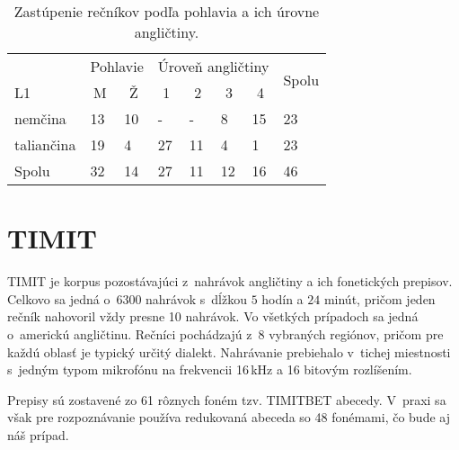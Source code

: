\begin{table}[]
\centering
\begin{tabular}{llllllll}
\hline
\multicolumn{1}{c}{} & \multicolumn{2}{c}{Pohlavie}                  & \multicolumn{4}{c}{Úroveň angličtiny}                                                         & \multicolumn{1}{c}{\multirow{2}{*}{Spolu}} \\
L1                   & \multicolumn{1}{c}{M} & \multicolumn{1}{c}{Ž} & \multicolumn{1}{c}{1} & \multicolumn{1}{c}{2} & \multicolumn{1}{c}{3} & \multicolumn{1}{c}{4} & \multicolumn{1}{c}{}                       \\ \hline
nemčina              & 13                    & 10                    & -                     & -                     & 8                     & 15                    & 23                                         \\
taliančina           & 19                    & 4                     & 27                    & 11                    & 4                     & 1                     & 23                                         \\
Spolu                & 32                    & 14                    & 27                    & 11                    & 12                    & 16                    & 46                                         \\ \hline
\end{tabular}
\caption{Zastúpenie rečníkov podľa pohlavia a ich úrovne angličtiny.} \label{tab:speaker-sample}
\end{table}



\section{TIMIT} \label{sec:timit}

TIMIT \cite{TIMIT1992}  je korpus pozostávajúci z~nahrávok angličtiny a ich fonetických prepisov. Celkovo sa jedná o~6300 nahrávok s~dĺžkou $5$ hodín a $24$ minút, pričom jeden rečník nahovoril vždy presne 10 nahrávok. Vo všetkých prípadoch sa jedná o~americkú angličtinu. Rečníci pochádzajú z~8 vybraných regiónov, pričom pre každú oblasť je typický určitý dialekt. Nahrávanie prebiehalo v~tichej miestnosti s~jedným typom mikrofónu na frekvencii 16\,kHz a 16 bitovým rozlíšením.

Prepisy sú zostavené zo 61 rôznych foném tzv. TIMITBET abecedy. V~praxi sa však pre rozpoznávanie používa redukovaná abeceda so 48 fonémami, čo bude aj náš prípad.

